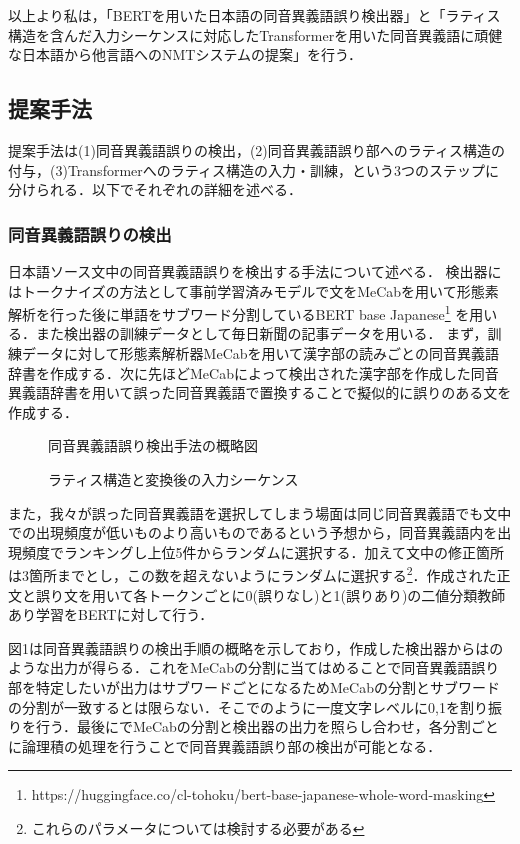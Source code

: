 \documentclass[a4j,10.5pt, twocolumn]{jarticle}
\begin{document}
以上より私は，「BERTを用いた日本語の同音異義語誤り検出器」と「ラティス構造を含んだ入力シーケンスに対応したTransformerを用いた同音異義語に頑健な日本語から他言語へのNMTシステムの提案」を行う．

\subsection{提案手法}
提案手法は(1)同音異義語誤りの検出，(2)同音異義語誤り部へのラティス構造の付与，(3)Transformerへのラティス構造の入力・訓練，という3つのステップに分けられる．以下でそれぞれの詳細を述べる．
\subsubsection{同音異義語誤りの検出}
日本語ソース文中の同音異義語誤りを検出する手法について述べる．
検出器にはトークナイズの方法として事前学習済みモデルで文をMeCabを用いて形態素解析を行った後に単語をサブワード分割しているBERT base Japanese\footnote{https://huggingface.co/cl-tohoku/bert-base-japanese-whole-word-masking}
を用いる．また検出器の訓練データとして毎日新聞の記事データを用いる．
まず，訓練データに対して形態素解析器MeCabを用いて漢字部の読みごとの同音異義語辞書を作成する．次に先ほどMeCabによって検出された漢字部を作成した同音異義語辞書を用いて誤った同音異義語で置換することで擬似的に誤りのある文を作成する．

\begin{figure}[h]
   \centering
    
    \caption{同音異義語誤り検出手法の概略図}
\end{figure}

\begin{figure}[h]
   \centering
    
    \caption{ラティス構造と変換後の入力シーケンス}
\end{figure}

また，我々が誤った同音異義語を選択してしまう場面は同じ同音異義語でも文中での出現頻度が低いものより高いものであるという予想から，同音異義語内を出現頻度でランキングし上位5件からランダムに選択する．加えて文中の修正箇所は3箇所までとし，この数を超えないようにランダムに選択する\footnote{これらのパラメータについては検討する必要がある}．作成された正文と誤り文を用いて各トークンごとに0(誤りなし)と1(誤りあり)の二値分類教師あり学習をBERTに対して行う．

図1は同音異義語誤りの検出手順の概略を示しており，作成した検出器からはのような出力が得らる．これをMeCabの分割に当てはめることで同音異義語誤り部を特定したいが出力はサブワードごとになるためMeCabの分割とサブワードの分割が一致するとは限らない．そこでのように一度文字レベルに0,1を割り振りを行う．最後にでMeCabの分割と検出器の出力を照らし合わせ，各分割ごとに論理積の処理を行うことで同音異義語誤り部の検出が可能となる．
\end{document}
